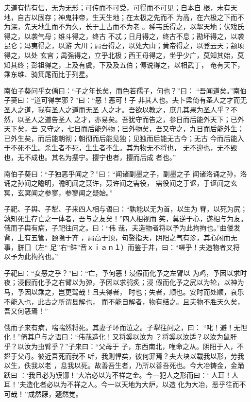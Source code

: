 \documentclass[]{article}
\begin{document}
夫道有情有信，无为无形；可传而不可受，可得而不可见；自本自
根，未有天地，自古以固存；神鬼神帝，生天生地；在太极之先而不
为高，在六极之下而不为深，先天地生而不为久，长于上古而不为老
。豨韦氏得之，以挈天地；伏戏氏得之，以袭气母；维斗得之，终古
不忒；日月得之，终古不息；勘坏得之，以袭昆仑；冯夷得之，以游
大川；肩吾得之，以处大山；黄帝得之，以登云天；颛顼得之，以处
玄宫；禺强得之，立乎北极；西王母得之，坐乎少广，莫知其始，莫
知其终；彭祖得之，上及有虞，下及及五伯；傅说得之，以相武丁，
奄有天下，乘东维、骑箕尾而比于列星。

南伯子葵问乎女偊曰：``子之年长矣，而色若孺子，何也？''曰：
``吾闻道矣。''南伯子葵曰：``道可得学邪？''曰：``恶！恶可！子
非其人也。夫卜梁倚有圣人之才而无圣人之道，我有圣人之道而无圣
人之才。吾欲以教之，庶几其果为圣人乎？不然，以圣人之道告圣人
之才，亦易矣。吾犹守而告之，参日而后能外天下；已外天下矣，吾
又守之，七日而后能外物；已外物矣，吾又守之，九日而后能外生；
已外生矣，而后能朝彻；朝彻而后能见独；见独而后能无古今；无古
今而后能入于不死不生。杀生者不死，生生者不生。其为物无不将也，
无不迎也，无不毁也，无不成也。其名为撄宁。撄宁也者，撄而后成 者也。''

南伯子葵曰：``子独恶乎闻之？''曰：``闻诸副墨之子，副墨之子
闻诸洛诵之孙，洛诵之孙闻之瞻明，瞻明闻之聂许，聂许闻之需役，
需役闻之于讴，于讴闻之玄冥，玄冥闻之参寥，参寥闻之疑始。''

子祀、子舆、子犁、子来四人相与语曰：``孰能以无为首，以生为
脊，以死为尻；孰知死生存亡之一体者，吾与之友矣！''四人相视而
笑，莫逆于心，遂相与为友。俄而子舆有病，子祀往问之。曰：``伟
哉，夫造物者将以予为此拘拘也。''曲偻发背，上有五管，颐隐于齐
，肩高于顶，句赘指天，阴阳之气有沴，其心闲而无事，胼囗（左``
足''右``鲜''音ｘｉａｎ１）而鉴于井，曰：``嗟乎！夫造物者又将
以予为此拘拘也。''

子祀曰：``女恶之乎？''曰：``亡，予何恶！浸假而化予之左臂以
为鸡，予因以求时夜；浸假而化予之右臂以为弹，予因以求鸮炙；浸
假而化予之尻以为轮，以神为马，予因以乘之，岂更驾哉！且夫得者，
时也；失者，顺也。安时而处顺，哀乐不能入也，此古之所谓县解也，
而不能自解者，物有结之。且夫物不胜天久矣，吾又何恶焉！''

俄而子来有病，喘喘然将死。其妻子环而泣之。子犁往问之，曰：
``叱！避！无怛化！''倚其户与之语曰：``伟哉造化！又将奚以汝为
？将奚以汝适？以汝为鼠肝乎？以汝为虫臂乎？''子来曰：``父母于
子，东西南北，唯命之从。阴阳于人，不翅于父母。彼近吾死而我不
听，我则悍矣，彼何罪焉？夫大块以载我以形，劳我以生，佚我以老
，息我以死。故善吾生者，乃所以善吾死也。今大冶铸金，金踊跃曰
：`我且必为镆铘！'大冶必以为不祥之金。今一犯人之形而曰：`
人耳！人耳！'夫造化者必以为不祥之人。今一以天地为大炉，以造
化为大冶，恶乎往而不可哉！''成然寐，蘧然觉。
\end{document}
